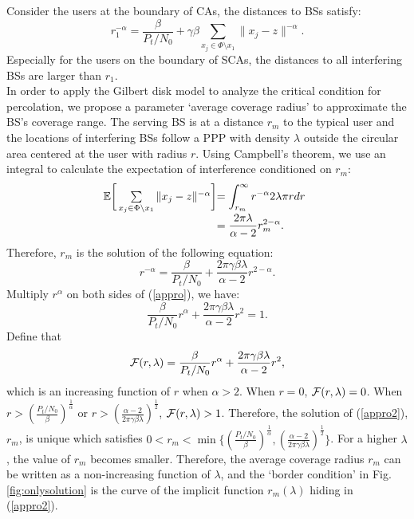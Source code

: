 \documentclass[final]{IEEEtran}
\begin{document}
Consider the users at the boundary of CAs, the distances to BSs satisfy:
\begin{equation}\label{nosharing1}
    r_{1}^{-\alpha}=\frac{\beta}{P_t/N_0}+\gamma\beta \sum\limits_{x_{j}\in\Phi\setminus x_{1}}\|x_{j}-z\|^{-\alpha}.
\end{equation}
Especially for the users on the boundary of SCAs, the distances to all interfering BSs are larger than $r_1$. \\
\indent In order to apply the Gilbert disk model to analyze the critical condition for percolation, we propose a parameter `average coverage radius' to approximate the BS's coverage range. The serving BS is at a distance $r_m$ to the typical user and the locations of interfering BSs follow a PPP with density $\lambda$ outside the circular area centered at the user with radius $r$. 
Using Campbell's theorem, we use an integral to calculate the expectation of interference conditioned on $r_m$:
\begin{equation}
\begin{array}{@{}r@{}l}
  \E\bigg[\sum\limits_{x_{j}\in\Phi\setminus x_{1}}\|x_{j}-z\|^{-\alpha}\bigg]&=\displaystyle\int_{r_{m}}^{\infty}r^{-\alpha}2\lambda\pi rdr\\
  &\displaystyle=\frac{2\pi \lambda}{\alpha-2}r_{m}^{2-\alpha}.
  \end{array}  
\end{equation}
\indent Therefore, $r_m$ is the solution of the following equation:
\begin{equation}
    r^{-\alpha}=\frac{\beta}{P_t/N_0}+\frac{2\pi \gamma\beta\lambda}{\alpha-2}r^{2-\alpha}.
\label{appro}
\end{equation}
Multiply $r^{\alpha}$ on both sides of (\ref{appro}), we have:
\begin{equation}\label{appro2}
    \frac{\beta}{P_t/N_0}r^{\alpha}+\frac{2\pi \gamma\beta\lambda}{\alpha-2}r^{2}=1.
\end{equation}
\indent Define that
\begin{equation}
{\mathcal{F}}(r,\lambda)=\frac{\beta}{P_t/N_0}r^{\alpha}+\frac{2\pi \gamma\beta\lambda}{\alpha-2}r^{2},
\label{Frlam}
\end{equation}
which is an increasing function of $r$ when $\alpha>2$. When $r=0$,  ${\mathcal{F}}(r,\lambda)=0$. When $r>(\frac{P_t/N_0}{\beta})^{\frac{1}{\alpha}}$ or $r>(\frac{\alpha-2}{2\pi\gamma\beta\lambda})^{\frac{1}{2}}$, ${\mathcal{F}}(r,\lambda)>1$. Therefore, the solution of (\ref{appro2}), $r_m$, is unique which satisfies $0<r_{m}<\min\{(\frac{P_t/N_0}{\beta})^{\frac{1}{\alpha}},(\frac{\alpha-2}{2\pi\gamma\beta\lambda})^{\frac{1}{2}}\}$. For a higher $\lambda$, the value of $r_m$ becomes smaller. Therefore, the average coverage radius $r_{m}$ can be written as a non-increasing function of $\lambda$, and the `border condition' in Fig.\ref{fig:onlysolution} is the curve of the implicit function $r_{m}(\lambda)$ hiding in (\ref{appro2}). \\
\end{document}
